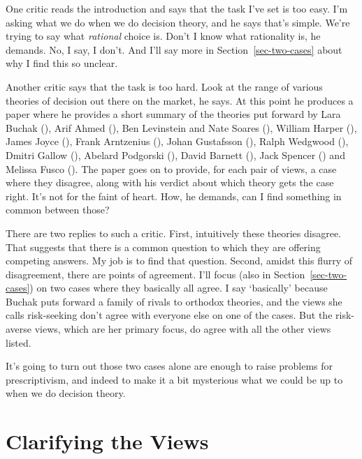 \documentclass[
  11pt,
  letterpaper,
  DIV=11,
  numbers=noendperiod,
  twoside]{scrartcl}
\begin{document}
One critic reads the introduction and says that the task I've set is too
easy. I'm asking what we do when we do decision theory, and he says
that's simple. We're trying to say what \emph{rational} choice is. Don't
I know what rationality is, he demands. No, I say, I don't. And I'll say
more in Section~\ref{sec-two-cases} about why I find this so unclear.

Another critic says that the task is too hard. Look at the range of
various theories of decision out there on the market, he says. At this
point he produces a paper where he provides a short summary of the
theories put forward by Lara Buchak (),
Arif Ahmed (), Ben Levinstein and Nate
Soares (), William Harper
(), James Joyce
(), Frank Arntzenius
(), Johan Gustafsson
(), Ralph Wedgwood
(), Dmitri Gallow
(), Abelard Podgorski
(), David Barnett
(), Jack Spencer
() and Melissa Fusco
(). The paper goes on to provide, for each
pair of views, a case where they disagree, along with his verdict about
which theory gets the case right. It's not for the faint of heart. How,
he demands, can I find something in common between those?

There are two replies to such a critic. First, intuitively these
theories disagree. That suggests that there is a common question to
which they are offering competing answers. My job is to find that
question. Second, amidst this flurry of disagreement, there are points
of agreement. I'll focus (also in Section~\ref{sec-two-cases}) on two
cases where they basically all agree. I say `basically' because Buchak
puts forward a family of rivals to orthodox theories, and the views she
calls risk-seeking don't agree with everyone else on one of the cases.
But the risk-averse views, which are her primary focus, do agree with
all the other views listed.

It's going to turn out those two cases alone are enough to raise
problems for prescriptivism, and indeed to make it a bit mysterious what
we could be up to when we do decision theory.

\section{Clarifying the Views}\label{sec-clarify}
\end{document}
